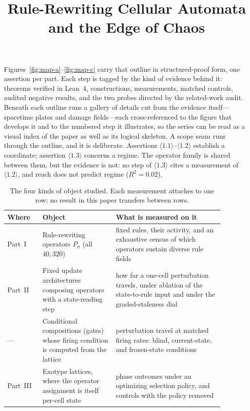 \documentclass[man,12pt,floatsintext,donotrepeattitle]{apa7}
\title{Rule-Rewriting Cellular Automata and the Edge of Chaos}
\newcommand{\sig}{\sigma}
\begin{document}
\maketitle



Figures~\ref{fig:map-a}--\ref{fig:map-c} carry that outline in
structured-proof form, one assertion per part. Each step is tagged by
the kind of evidence behind it: theorems verified in Lean~4,
constructions, measurements, matched controls, audited negative
results, and the two probes directed by the related-work
audit. Beneath each outline runs a gallery of details cut from the
evidence itself---spacetime plates and damage fields---each
cross-referenced to the figure that develops it and to the numbered
step it illustrates, so the series can be read as a visual index of
the paper as well as its logical skeleton.  A scope seam runs through
the outline, and it is deliberate. Assertions
$\langle1.1\rangle$--$\langle1.2\rangle$ establish a coordinate;
assertion $\langle1.3\rangle$ concerns a regime. The operator family
is shared between them, but the evidence is not: no step of
$\langle1.3\rangle$ cites a measurement of $\langle1.2\rangle$, and
reach does not predict regime ($R^2 = 0.02$).

\begin{table}[tbp]
\caption{The four kinds of object studied. Each measurement attaches to one
row; no result in this paper transfers between rows.}
\label{tab:objects}
\begin{tabular}{@{}p{0.14\linewidth}p{0.30\linewidth}p{0.44\linewidth}@{}}
\toprule
Where & Object & What is measured on it \\
\midrule
Part~I & Rule-rewriting operators $P_\sig$ (all $40{,}320$) &
fixed rules, their activity, and an exhaustive census of which operators
sustain diverse rule fields \\
Part~II & Fixed update architectures composing operators with a
state-reading step & how far a one-cell perturbation travels, under
ablation of the state-to-rule input and under the graded-staleness dial \\
--- & Conditional compositions (gates) whose firing condition is computed
from the lattice & perturbation travel at matched firing rates: blind,
current-state, and frozen-state conditions \\
Part~III & Exotype lattices, where the operator assignment is itself
per-cell state & phase outcomes under an optimizing selection policy, and
controls with the policy removed \\
\bottomrule
\end{tabular}
\end{table}
\end{document}
